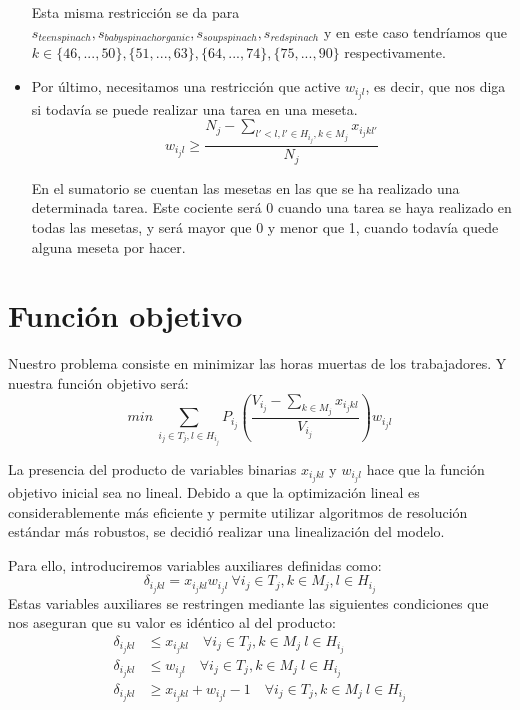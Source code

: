 \begin{itemize}
        Esta misma restricción se da para $s_{teenspinach}, s_{babyspinachorganic}, s_{soupspinach}, s_{redspinach}$ y en este caso tendríamos que $k \in \{46, ..., 50\},\{51, ..., 63\},\{64, ..., 74\},\{75, ..., 90\}$
        respectivamente.

    \item  Por último, necesitamos una restricción que active $w_{i_j l}$, es decir, que nos diga si todavía se puede realizar una tarea en una meseta. 
        \[
	        \displaystyle w_{i_j l}\geq \frac{N_j-\sum_{l'<l, l'\in H_{i_j}, k\in M_j}x_{i_j kl'}}{N_j}
        \]
	
	    En el sumatorio se cuentan las mesetas en las que se ha realizado una determinada tarea. Este cociente será $0$ cuando una tarea se haya realizado en todas las mesetas, y será mayor que 0 y menor que 1, cuando todavía quede alguna meseta por hacer. 
	
\end{itemize}


\section*{Función objetivo}
Nuestro problema consiste en minimizar las horas muertas de los trabajadores. Y nuestra función objetivo será: 
	\[
	    min\ \sum_{i_j \in T_j, l\in H_{i_j}}P_{i_j}\left(\frac{V_{i_j}-\sum_{k\in M_j}x_{i_j kl}}{V_{i_j}}\right)w_{i_j l}
    \]

    La presencia del producto de variables binarias $x_{i_j kl}$ y  $w_{i_j l}$ hace que la función objetivo inicial sea no lineal.
    Debido a que la optimización lineal es considerablemente más eficiente y permite utilizar algoritmos de resolución estándar más robustos,
    se decidió realizar una linealización del modelo.

    Para ello, introduciremos variables auxiliares definidas como:
    \[
        \delta_{i_j k l}=x_{i_j k l}w_{i_j l} \ \forall i_j \in T_j, k \in M_j, l \in H_{i_j}
    \]
    Estas variables auxiliares se restringen mediante las siguientes condiciones que nos aseguran que su valor es idéntico al del producto:
    \[\begin{aligned}
        \delta_{i_j k l} &\leq x_{i_j k l} \quad \forall i_j \in T_j, k \in M_j \ l\in H_{i_j}\\
        \delta_{i_j k l} &\leq w_{i_j l} \quad \forall i_j \in T_j, k \in M_j \ l\in H_{i_j}\\
	    \delta_{i_j k l} &\geq x_{i_j k l} + w_{i_j l} -1 \quad \forall i_j \in T_j, k \in M_j \ l\in H_{i_j}
    \end{aligned}\]

